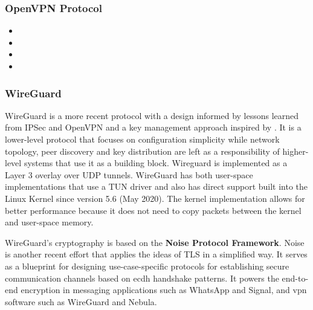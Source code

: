 
\hypertarget{openvpn-protocol}{%
\subsubsection{OpenVPN Protocol}\label{openvpn-protocol}}

\begin{itemize}
\tightlist
\item
\item
\item
\item
\end{itemize}

\hypertarget{wireguard}{%
\subsubsection{WireGuard}\label{wireguard}}

WireGuard \autocite{donenfeldWireGuardNextGeneration2017} is a more
recent protocol with a design informed by lessons learned from IPSec and
OpenVPN and a key management approach inspired by . It
is a lower-level protocol that focuses on configuration simplicity while
network topology, peer discovery and key distribution are left as a
responsibility of higher-level systems that use it as a building block.
Wireguard is implemented as a Layer 3 overlay over UDP tunnels.
WireGuard has both user-space implementations that use a TUN driver and
also has direct support built into the Linux Kernel since version 5.6
(May 2020). The kernel implementation allows for better performance
because it does not need to copy packets between the kernel and
user-space memory.

WireGuard's cryptography is based on the \textbf{Noise Protocol
Framework}\autocite{noiseDocs}. Noise is another recent effort that
applies the ideas of TLS in a simplified way. It serves as a blueprint
for designing use-case-specific protocols for establishing secure
communication channels based on \gls{ecdh} handshake patterns. It powers
the end-to-end encryption in messaging applications such as WhatsApp and
Signal, and \gls{vpn} software such as WireGuard and Nebula.
 

